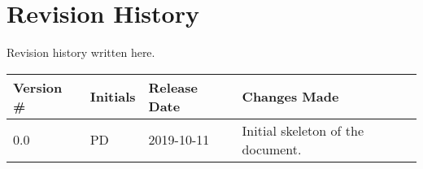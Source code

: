 \thispagestyle{empty}
\section*{Revision History}

Revision history written here.

\begin{table}[H]
\begin{tabular}{llll}
\hline
Version \# & Initials & Release Date & Changes Made \\ \hline
0.0 & PD & 2019-10-11 & Initial skeleton of the document.\\
\hline
\end{tabular}
\end{table}